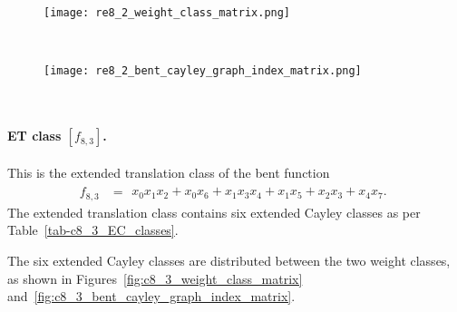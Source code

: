 \documentclass[12pt,a4paper]{article}
\begin{document}
\begin{figure}[!bhpt] %
\centering
\begin{minipage}{.48\textwidth}
  \centering
  \texttt{[image: re8\_2\_weight\_class\_matrix.png]}
  \label{fig:c8_2_weight_class_matrix}
\end{minipage}%
~~~~
\begin{minipage}{.48\textwidth}
  \centering
  \texttt{[image: re8\_2\_bent\_cayley\_graph\_index\_matrix.png]}
  \label{fig:c8_2_bent_cayley_graph_index_matrix}
\end{minipage}
\end{figure}
~
%
\paragraph*{ET class $[f_{8,3}]$.}
%
This is the extended translation class of the bent function
\small{}
\begin{align*}
f_{ 8 , 3 } &=
\begin{array}{l}
x_{0} x_{1} x_{2} + x_{0} x_{6} + x_{1} x_{3} x_{4} + x_{1} x_{5} + x_{2} x_{3} + x_{4} x_{7}.
\end{array}
\end{align*}
\normalsize{}
The extended translation class contains six extended Cayley classes as per Table~\ref{tab-c8_3_EC_classes}.

The six extended Cayley classes are distributed between the two weight classes,
as shown in Figures~\ref{fig:c8_3_weight_class_matrix} and~\ref{fig:c8_3_bent_cayley_graph_index_matrix}.
\end{document}
